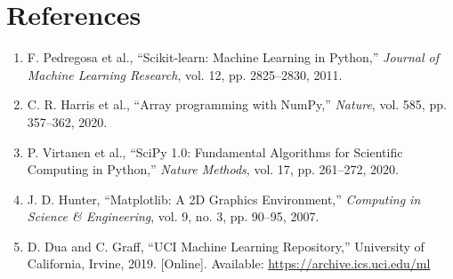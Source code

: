 \documentclass[12pt,a4paper]{article}
\DeclareRobustCommand{\_}{\textunderscore\allowbreak}
\begin{document}
\section{References}
\begin{enumerate}
\item F. Pedregosa et al., ``Scikit-learn: Machine Learning in Python,''
\emph{Journal of Machine Learning Research}, vol. 12, pp. 2825--2830, 2011.
\item C. R. Harris et al., ``Array programming with NumPy,'' \emph{Nature},
vol. 585, pp. 357--362, 2020.
\item P. Virtanen et al., ``SciPy 1.0: Fundamental Algorithms for Scientific
Computing in Python,'' \emph{Nature Methods}, vol. 17, pp. 261--272, 2020.
\item J. D. Hunter, ``Matplotlib: A 2D Graphics Environment,'' \emph{Computing
in Science \& Engineering}, vol. 9, no. 3, pp. 90--95, 2007.
\item D. Dua and C. Graff, ``UCI Machine Learning Repository,'' University of
California, Irvine, 2019. [Online]. Available: \url{https://archive.ics.uci.edu/ml}
\end{enumerate}
\end{document}
